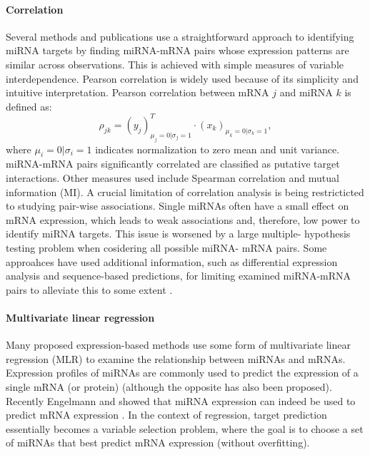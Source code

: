 \paragraph{Correlation}
Several methods and publications use a straightforward approach to identifying
miRNA targets by finding miRNA-mRNA pairs whose expression patterns are
similar across observations. This is achieved with simple measures of variable
interdependence. Pearson correlation is widely used because of its simplicity
and intuitive interpretation. Pearson correlation between mRNA $j$ and miRNA
$k$ is defined as:
\begin{equation}
	\rho_{jk} = (y_j)_{\mu_j=0|\sigma_j=1}^T \cdot (x_k)_{\mu_k=0|\sigma_k=1},
	\label{eq:pearson}
\end{equation}
where $\mu_i=0|\sigma_i=1$ indicates normalization to zero mean and unit
variance. miRNA-mRNA pairs significantly correlated are classified as putative
target interactions. Other measures used include Spearman correlation and
mutual information (MI). A crucial limitation of correlation analysis is being
restricticted to studying pair-wise associations. Single miRNAs often have a
small effect on mRNA expression, which leads to weak associations and,
therefore, low power to identify miRNA targets. This issue is worsened by a
large multiple- hypothesis testing problem when cosidering all possible miRNA-
mRNA pairs. Some approahces have used additional information, such as
differential expression analysis and sequence-based predictions, for limiting
examined miRNA-mRNA pairs to alleviate this to some extent
\citep{Muniategui2013}.

\paragraph{Multivariate linear regression}
Many proposed expression-based methods use some form of multivariate linear
regression (MLR) to examine the relationship between miRNAs and mRNAs.
Expression profiles of miRNAs are commonly used to predict the expression of a
single mRNA (or protein) (although the opposite has also been proposed).
Recently Engelmann and showed that miRNA expression can indeed be used to
predict mRNA expression \citep{Engelmann2012}. In the context of regression,
target prediction essentially becomes a variable selection problem, where the
goal is to choose a set of miRNAs that best predict mRNA expression (without
overfitting).

